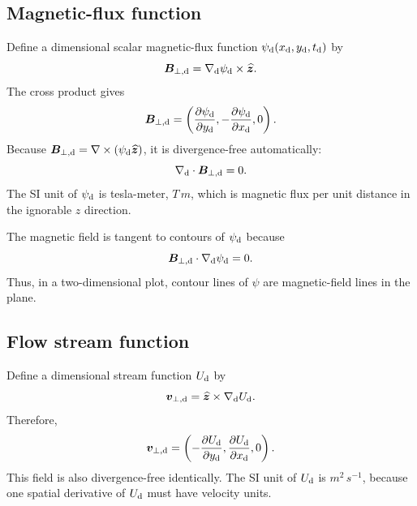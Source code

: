 \subsection{Magnetic-flux function}

Define a dimensional scalar magnetic-flux function $\psi_{\rm d}(x_{\rm d},y_{\rm d},t_{\rm d})$ by
\begin{equation}
\bm{B}_{\perp,\rm d}
=\nabla_{\rm d}\psi_{\rm d}\times\widehat{\bm{z}}.
\label{eq:Bpsi_dim}
\end{equation}
The cross product gives
\begin{equation}
\bm{B}_{\perp,\rm d}
=\left(\frac{\partial\psi_{\rm d}}{\partial y_{\rm d}},
-\frac{\partial\psi_{\rm d}}{\partial x_{\rm d}},0\right).
\label{eq:Bcomponents_dim}
\end{equation}
Because $\bm{B}_{\perp,\rm d}=\nabla\times(\psi_{\rm d}\widehat{\bm{z}})$, it is divergence-free automatically:
\begin{equation}
\nabla_{\rm d}\cdot\bm{B}_{\perp,\rm d}=0.
\end{equation}
The SI unit of $\psi_{\rm d}$ is tesla-meter, $\unit{T\,m}$, which is magnetic flux per unit distance in the ignorable $z$ direction.

The magnetic field is tangent to contours of $\psi_{\rm d}$ because
\begin{equation}
\bm{B}_{\perp,\rm d}\cdot\nabla_{\rm d}\psi_{\rm d}=0.
\end{equation}
Thus, in a two-dimensional plot, contour lines of $\psi$ are magnetic-field lines in the plane.

\subsection{Flow stream function}

Define a dimensional stream function $U_{\rm d}$ by
\begin{equation}
\bm{v}_{\perp,\rm d}
=\widehat{\bm{z}}\times\nabla_{\rm d}U_{\rm d}.
\label{eq:vU_dim}
\end{equation}
Therefore,
\begin{equation}
\bm{v}_{\perp,\rm d}
=\left(-\frac{\partial U_{\rm d}}{\partial y_{\rm d}},
\frac{\partial U_{\rm d}}{\partial x_{\rm d}},0\right).
\label{eq:vcomponents_dim}
\end{equation}
This field is also divergence-free identically. The SI unit of $U_{\rm d}$ is $\unit{m^2\,s^{-1}}$, because one spatial derivative of $U_{\rm d}$ must have velocity units.

